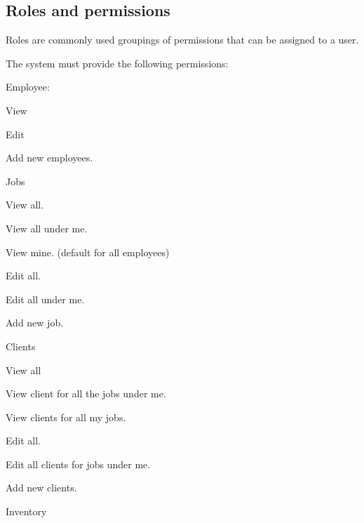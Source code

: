 \documentclass{article}
\begin{document}
	\subsection*{Roles and permissions}	
	\begin{list}{R.}{}
		\item Roles are commonly used groupings of permissions that can be assigned to a user.
		\item The system must provide the following permissions:
		\begin{list}{R.}{}
			\item Employee:
			\begin{list}{R...}{}
				\item View
				\item Edit
				\item Add new employees.
			\end{list} 
			\item Jobs
			\begin{list}{R...}{}
				\item View all.
				\item View all under me. 
				\item View mine. (default for all employees)
				\item Edit all.
				\item Edit all under me.
				\item Add new job.
			\end{list}
			\item Clients
			\begin{list}{R...}{}
				\item View all
				\item View client for all the jobs under me.
				\item View clients for all my jobs.
				\item Edit all.
				\item Edit all clients for jobs under me.
				\item Add new clients.
			\end{list}
			\item Inventory
			\begin{list}{R...}{}

\end{list}
\end{list}
\end{list}
\end{document}
